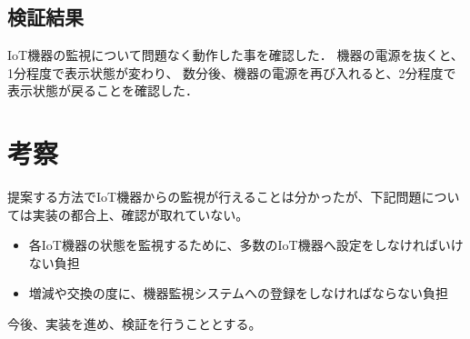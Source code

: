 \subsection{検証結果}
IoT機器の監視について問題なく動作した事を確認した．
機器の電源を抜くと、1分程度で表示状態が変わり、
数分後、機器の電源を再び入れると、2分程度で表示状態が戻ることを確認した．

\section{考察}
提案する方法でIoT機器からの監視が行えることは分かったが、下記問題については実装の都合上、確認が取れていない。
\begin{itemize}
\item 各IoT機器の状態を監視するために、多数のIoT機器へ設定をしなければいけない負担
\item 増減や交換の度に、機器監視システムへの登録をしなければならない負担
\end{itemize}
今後、実装を進め、検証を行うこととする。


